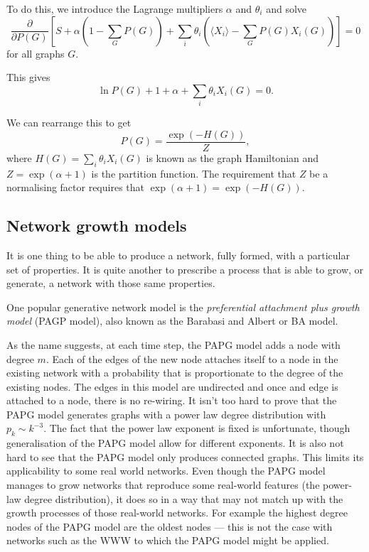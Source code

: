 \documentclass{article}
\begin{document}
To do this, we introduce the Lagrange multipliers $\alpha$ and $\theta_i$ and solve
$$
	\frac{\partial}{\partial P(G)}\left[S + \alpha \left(1-\sum_G P(G)\right) + \sum_i \theta_i \left(\langle X_i \rangle - \sum_G P(G)X_i(G)\right) \right] = 0
$$
for all graphs $G$.

This gives
$$
	\ln P(G) +1 +\alpha +\sum_i\theta_iX_i(G) = 0.
$$

We can rearrange this to get
$$
	P(G) = \frac{\exp(-H(G))}{Z},
$$
where $H(G) = \sum_i\theta_iX_i(G)$ is known as the graph Hamiltonian and $Z = \exp(\alpha+1)$ is the partition function. The requirement that $Z$ be a normalising factor requires that $\exp(\alpha+1) = \exp(-H(G))$.

\subsection{Network growth models}
It is one thing to be able to produce a network, fully formed, with a particular set of properties. It is quite another to prescribe a process that is able to grow, or generate, a network with those same properties.

One popular generative network model is the \emph{preferential attachment plus growth model} (PAGP model), also known as the Barabasi and Albert or BA model.

As the name suggests, at each time step, the PAPG model adds a node with degree $m$. Each of the edges of the new node attaches itself to a node in the existing network with a probability that is proportionate to the degree of the existing nodes. The edges in this model are undirected and once and edge is attached to a node, there is no re-wiring. It isn't too hard to prove that the PAPG model generates graphs with a power law degree distribution with $p_k \sim k^{-3}$. The fact that the power law exponent is fixed is unfortunate, though generalisation of the PAPG model allow for different exponents. It is also not hard to see that the PAPG model only produces connected graphs. This limits its applicability to some real world networks. Even though the PAPG model manages to grow networks that reproduce some real-world features (the power-law degree distribution), it does so in a way that may not match up with the growth processes of those real-world networks. For example the highest degree nodes of the PAPG model are the oldest nodes --- this is not the case with networks such as the WWW to which the PAPG model might be applied.
\end{document}
